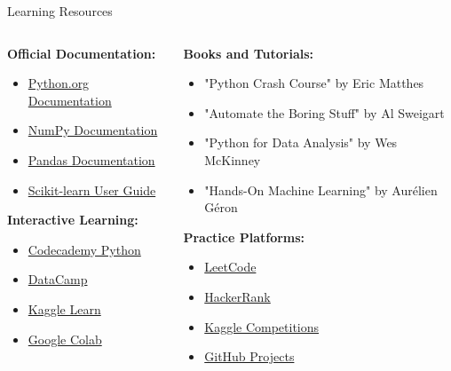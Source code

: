 \begin{frame}{Learning Resources}
    \begin{columns}
        \begin{column}{0.5\textwidth}
            \textbf{Official Documentation:}
            \begin{itemize}
                \item \href{https://docs.python.org/3/}{Python.org Documentation}
                \item \href{https://numpy.org/doc/}{NumPy Documentation}
                \item \href{https://pandas.pydata.org/docs/}{Pandas Documentation}
                \item \href{https://scikit-learn.org/stable/}{Scikit-learn User Guide}
            \end{itemize}
            
            \textbf{Interactive Learning:}
            \begin{itemize}
                \item \href{https://www.codecademy.com/learn/learn-python-3}{Codecademy Python}
                \item \href{https://www.datacamp.com/}{DataCamp}
                \item \href{https://www.kaggle.com/learn}{Kaggle Learn}
                \item \href{https://colab.research.google.com/}{Google Colab}
            \end{itemize}
        \end{column}
        
        \begin{column}{0.5\textwidth}
            \textbf{Books and Tutorials:}
            \begin{itemize}
                \item "Python Crash Course" by Eric Matthes
                \item "Automate the Boring Stuff" by Al Sweigart
                \item "Python for Data Analysis" by Wes McKinney
                \item "Hands-On Machine Learning" by Aurélien Géron
            \end{itemize}
            
            \textbf{Practice Platforms:}
            \begin{itemize}
                \item \href{https://leetcode.com/}{LeetCode}
                \item \href{https://www.hackerrank.com/}{HackerRank}
                \item \href{https://www.kaggle.com/competitions}{Kaggle Competitions}
                \item \href{https://github.com/}{GitHub Projects}
            \end{itemize}
        \end{column}
    \end{columns}
\end{frame}

